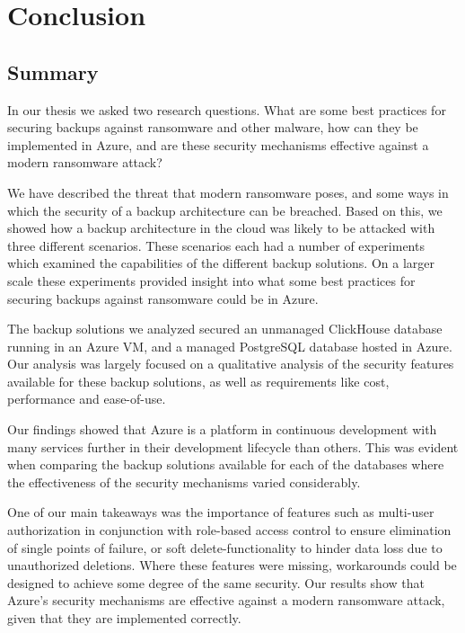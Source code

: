 \chapter{Conclusion}

\section{Summary}
In our thesis we asked two research questions. What are some best practices for securing backups against ransomware and other malware, how can they be implemented in Azure, and are these security mechanisms effective against a modern ransomware attack? 

We have described the threat that modern ransomware poses, and some ways in which the security of a backup architecture can be breached. Based on this, we showed how a backup architecture in the cloud was likely to be attacked with three different scenarios. These scenarios each had a number of experiments which examined the capabilities of the different backup solutions. On a larger scale these experiments provided insight into what some best practices for securing backups against ransomware could be in Azure.

The backup solutions we analyzed secured an unmanaged ClickHouse database running in an Azure VM, and a managed PostgreSQL database hosted in Azure. Our analysis was largely focused on a qualitative analysis of the security features available for these backup solutions, as well as requirements like cost, performance and ease-of-use. 

Our findings showed that Azure is a platform in continuous development with many services further in their development lifecycle than others. This was evident when comparing the backup solutions available for each of the databases where the effectiveness of the security mechanisms varied considerably. 

One of our main takeaways was the importance of features such as multi-user authorization in conjunction with role-based access control to ensure elimination of single points of failure, or soft delete-functionality to hinder data loss due to unauthorized deletions. Where these features were missing, workarounds could be designed to achieve some degree of the same security. Our results show that Azure’s security mechanisms are effective against a modern ransomware attack, given that they are implemented correctly. 



